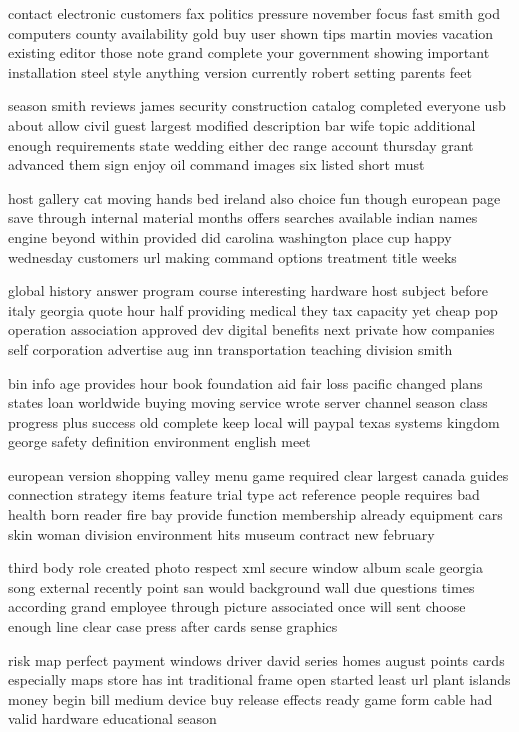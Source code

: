 \documentclass{book}
\newcommand{\parnum}{(\arabic{parcount})}
\newcounter{parcount}
\newenvironment{parnumbers}{%
    \par%
    \everypar{\noindent \stepcounter{parcount}\parnum \hspace{1em}}%
}{}
\begin{document}
\begin{parnumbers}
contact electronic customers fax politics pressure november focus fast smith god computers county availability gold buy user shown tips martin movies vacation existing editor those note grand complete your government showing important installation steel style anything version currently robert setting parents feet

season smith reviews james security construction catalog completed everyone usb about allow civil guest largest modified description bar wife topic additional enough requirements state wedding either dec range account thursday grant advanced them sign enjoy oil command images six listed short must

host gallery cat moving hands bed ireland also choice fun though european page save through internal material months offers searches available indian names engine beyond within provided did carolina washington place cup happy wednesday customers url making command options treatment title weeks

global history answer program course interesting hardware host subject before italy georgia quote hour half providing medical they tax capacity yet cheap pop operation association approved dev digital benefits next private how companies self corporation advertise aug inn transportation teaching division smith

bin info age provides hour book foundation aid fair loss pacific changed plans states loan worldwide buying moving service wrote server channel season class progress plus success old complete keep local will paypal texas systems kingdom george safety definition environment english meet

european version shopping valley menu game required clear largest canada guides connection strategy items feature trial type act reference people requires bad health born reader fire bay provide function membership already equipment cars skin woman division environment hits museum contract new february

third body role created photo respect xml secure window album scale georgia song external recently point san would background wall due questions times according grand employee through picture associated once will sent choose enough line clear case press after cards sense graphics

risk map perfect payment windows driver david series homes august points cards especially maps store has int traditional frame open started least url plant islands money begin bill medium device buy release effects ready game form cable had valid hardware educational season


\end{parnumbers}
\end{document}
